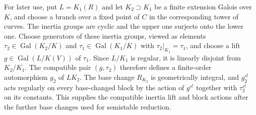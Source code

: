 For later use, put $L=K_1(R)$ and let $K_2\supset K_1$ be a finite extension Galois
over $K$, and choose a branch over a fixed point of $C$ in the
corresponding tower of curves.  The inertia groups are cyclic and
the upper one surjects onto the lower one.  Choose generators of
these inertia groups, viewed as elements
$\tau_2\in\operatorname{Gal}(K_2/K)$ and
$\tau_1\in\operatorname{Gal}(K_1/K)$ with
$\tau_2|_{K_1}=\tau_1$, and choose a lift
$g\in\operatorname{Gal}(L/K(V))$ of $\tau_1$.
Since $L/K_1$ is regular, it is linearly disjoint from $K_2/K_1$.
The compatible pair $(g,\tau_2)$ therefore defines a finite-order
automorphism $g_2$ of $LK_2$.  The base change $R_{K_2}$ is
geometrically integral, and $g_2^{s!}$ acts regularly on every
base-changed block by the action of $g^{s!}$ together with
$\tau_2^{s!}$ on its constants.  This supplies the compatible
inertia lift and block actions after the further base changes used
for semistable reduction.
